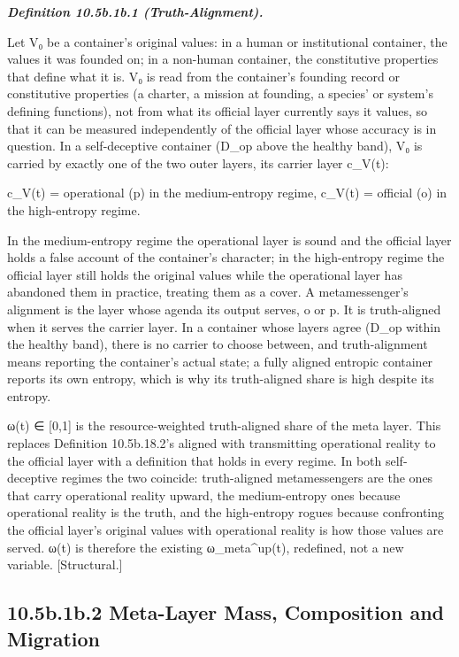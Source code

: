 \documentclass[
]{article}
\begin{document}
\emph{\textbf{Definition 10.5b.1b.1 (Truth-Alignment).}}

Let V₀ be a container's original values: in a human or institutional
container, the values it was founded on; in a non-human container, the
constitutive properties that define what it is. V₀ is read from the
container's founding record or constitutive properties (a charter, a
mission at founding, a species' or system's defining functions), not
from what its official layer currently says it values, so that it can be
measured independently of the official layer whose accuracy is in
question. In a self-deceptive container (D\_op above the healthy band),
V₀ is carried by exactly one of the two outer layers, its carrier layer
c\_V(t):

c\_V(t) = operational (p) in the medium-entropy regime, c\_V(t) =
official (o) in the high-entropy regime.

In the medium-entropy regime the operational layer is sound and the
official layer holds a false account of the container's character; in
the high-entropy regime the official layer still holds the original
values while the operational layer has abandoned them in practice,
treating them as a cover. A metamessenger's alignment is the layer whose
agenda its output serves, o or p. It is truth-aligned when it serves the
carrier layer. In a container whose layers agree (D\_op within the
healthy band), there is no carrier to choose between, and
truth-alignment means reporting the container's actual state; a fully
aligned entropic container reports its own entropy, which is why its
truth-aligned share is high despite its entropy.

ω(t) ∈ {[}0,1{]} is the resource-weighted truth-aligned share of the
meta layer. This replaces Definition 10.5b.18.2's
\textquotesingle aligned with transmitting operational reality to the
official layer\textquotesingle{} with a definition that holds in every
regime. In both self-deceptive regimes the two coincide: truth-aligned
metamessengers are the ones that carry operational reality upward, the
medium-entropy ones because operational reality is the truth, and the
high-entropy rogues because confronting the official layer's original
values with operational reality is how those values are served. ω(t) is
therefore the existing ω\_meta\^{}up(t), redefined, not a new variable.
{[}Structural.{]}

\hypertarget{b.1b.2-meta-layer-mass-composition-and-migration}{%
\subsection{10.5b.1b.2 Meta-Layer Mass, Composition and
Migration}\label{b.1b.2-meta-layer-mass-composition-and-migration}}
\end{document}
